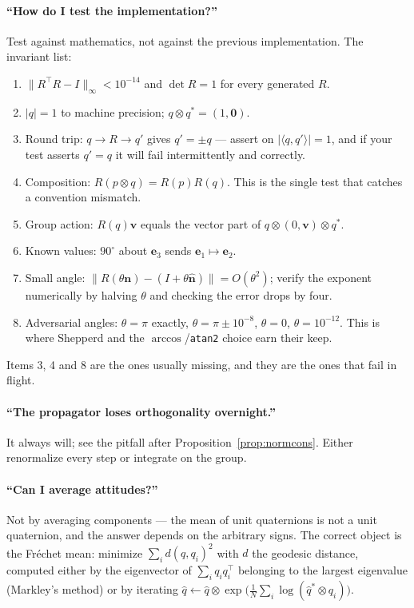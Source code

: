 \documentclass[11pt]{article}
\newcommand{\vv}[1]{\bm{#1}}
\newcommand{\hatmap}[1]{\widehat{#1}}
\theoremstyle{plain}
\theoremstyle{definition}
\begin{document}
\paragraph{``How do I test the implementation?''}
Test against mathematics, not against the previous implementation. The invariant list:
\begin{enumerate}[leftmargin=1.4em,topsep=2pt]
\item $\|R^{\!\top}R-I\|_\infty<10^{-14}$ and $\det R=1$ for every generated $R$.
\item $|q|=1$ to machine precision; $q\otimes q^{*}=(1,\vv 0)$.
\item Round trip: $q\to R\to q'$ gives $q'=\pm q$ --- assert on $|\langle q,q'\rangle|=1$, and if
your test asserts $q'=q$ it will fail intermittently and correctly.
\item Composition: $R(p\otimes q)=R(p)R(q)$. This is the single test that catches a convention
mismatch.
\item Group action: $R(q)\vv v$ equals the vector part of $q\otimes(0,\vv v)\otimes q^{*}$.
\item Known values: $90^\circ$ about $\vv e_3$ sends $\vv e_1\mapsto\vv e_2$.
\item Small angle: $\|R(\theta\vv n)-(I+\theta\hatmap{\vv n})\|=O(\theta^2)$; verify the exponent
numerically by halving $\theta$ and checking the error drops by four.
\item Adversarial angles: $\theta=\pi$ exactly, $\theta=\pi\pm10^{-8}$, $\theta=0$,
$\theta=10^{-12}$. This is where Shepperd and the $\arccos$/\texttt{atan2} choice earn their keep.
\end{enumerate}
Items 3, 4 and 8 are the ones usually missing, and they are the ones that fail in flight.

\paragraph{``The propagator loses orthogonality overnight.''}
It always will; see the pitfall after Proposition~\ref{prop:normcons}. Either renormalize every
step or integrate on the group.

\paragraph{``Can I average attitudes?''}
Not by averaging components --- the mean of unit quaternions is not a unit quaternion, and the
answer depends on the arbitrary signs. The correct object is the Fr\'echet mean: minimize
$\sum_i d(q,q_i)^2$ with $d$ the geodesic distance, computed either by the eigenvector of
$\sum_iq_iq_i^{\!\top}$ belonging to the largest eigenvalue (Markley's method) or by iterating
$\hat q\leftarrow\hat q\otimes\exp\big(\tfrac1N\sum_i\log(\hat q^{*}\otimes q_i)\big)$.
\end{document}
